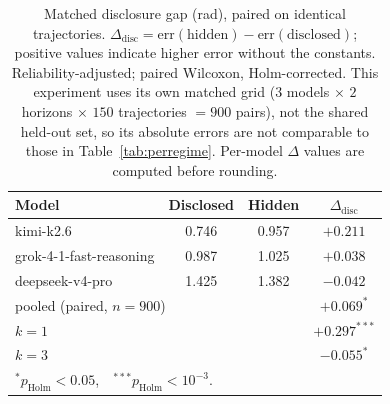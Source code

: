 \documentclass{article}
\begin{document}
\begin{table}[tbp]
\centering\small
\caption{Matched disclosure gap (rad), paired on identical
trajectories. $\Delta_{\mathrm{disc}}=\mathrm{err}(\text{hidden})-
\mathrm{err}(\text{disclosed})$; positive values indicate higher error without the
constants. Reliability-adjusted; paired Wilcoxon, Holm-corrected. This experiment uses its
own matched grid ($3$ models $\times$ $2$ horizons $\times$ $150$ trajectories $=900$
pairs), not the shared held-out set, so its absolute errors are not comparable to those in
Table~\ref{tab:perregime}. Per-model $\Delta$ values are computed before rounding.}\label{tab:sysid}
\begin{tabular}{lccc}
\toprule
Model & Disclosed & Hidden & $\Delta_{\mathrm{disc}}$ \\
\midrule
kimi-k2.6 & 0.746 & 0.957 & $+0.211$ \\
grok-4-1-fast-reasoning & 0.987 & 1.025 & $+0.038$ \\
deepseek-v4-pro & 1.425 & 1.382 & $-0.042$ \\
\midrule
\multicolumn{3}{l}{pooled (paired, $n{=}900$)} & $+0.069^{*}$ \\
\multicolumn{3}{l}{\quad $k{=}1$} & $+0.297^{***}$ \\
\multicolumn{3}{l}{\quad $k{=}3$} & $-0.055^{*}$ \\
\bottomrule
\multicolumn{4}{l}{\footnotesize $^{*}p_{\mathrm{Holm}}{<}0.05$,\ \ $^{***}p_{\mathrm{Holm}}{<}10^{-3}$.}
\end{tabular}
\end{table}
\end{document}
